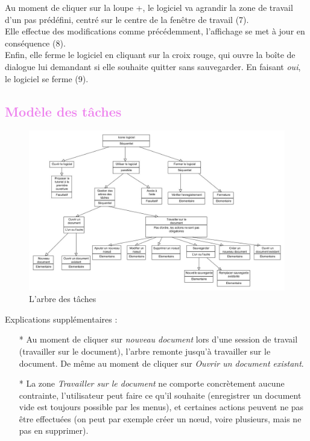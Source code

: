 \documentclass[12pt, a4paper]{article}
\begin{document}
Au moment de cliquer sur la loupe +, le logiciel va agrandir la zone de travail d'un pas prédéfini, centré sur le centre de la fenêtre de travail (7).\\


Elle effectue des modifications comme précédemment, l'affichage se met à jour en conséquence (8).\\


Enfin, elle ferme le logiciel en cliquant sur la croix rouge, qui ouvre la boîte de dialogue lui demandant si elle souhaite quitter sans sauvegarder. En faisant \emph{oui}, le logiciel se ferme (9).

\textcolor{Violet}{\section{Modèle des tâches}}

\begin{figure}[h]
\begin{center}
   \includegraphics[scale = 0.4]{arbre-des-taches.jpg}
	\caption{L'arbre des tâches}
	\end{center}
\end{figure}


Explications supplémentaires : 
\begin{itemize}
\item [*]Au moment de cliquer sur \emph{nouveau document} lors d'une session de travail (travailler sur le document), l'arbre remonte jusqu'à travailler sur le document. De même au moment de cliquer sur \emph{Ouvrir un document existant}.
\item [*]La zone \emph{Travailler sur le document} ne comporte concrètement aucune contrainte, l'utilisateur peut faire ce qu'il souhaite (enregistrer un document vide est toujours possible par les menus), et certaines actions peuvent ne pas être effectuées (on peut par exemple créer un nœud, voire plusieurs, mais ne pas en supprimer).
\end{itemize}
\end{document}
